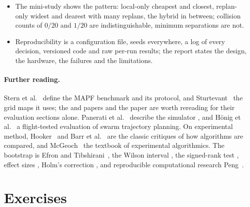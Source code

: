 \begin{summary}
\begin{itemize}
        (\cref{thm:ch25-three}), means with $t$ intervals, skewed metrics
        with medians and IQR, paired differences with intervals and $d_z$,
        success rates with the cap; draw box plots per level, cactus plots
        for effort, Pareto plots for the safety--efficiency trade-off.
  \item The mini-study shows the pattern: local-only cheapest and closest,
        replan-only widest and dearest with many replans, the hybrid in
        between; collision counts of $0/20$ and $1/20$ are
        indistinguishable, minimum separations are not.
  \item Reproducibility is a configuration file, seeds everywhere, a log of
        every decision, versioned code and raw per-run results; the report
        states the design, the hardware, the failures and the limitations.
\end{itemize}
\end{summary}

\paragraph{Further reading.}
Stern et al.~\cite{stern2019mapf} define the MAPF benchmark and its
protocol, and Sturtevant~\cite{sturtevant2012benchmarks} the grid maps it
uses; the \cbs and \ecbs papers \cite{sharon2015cbs,barer2014ecbs} and the
\orca paper \cite{vandenberg2011orca} are worth rereading for their
evaluation sections alone. Panerati et al.~\cite{panerati2021learning}
describe the simulator \allowbreak{}, and H{\"o}nig et
al.~\cite{honig2018trajectory} a flight-tested evaluation of swarm
trajectory planning. On experimental method, Hooker~\cite{hooker1995testing}
and Barr et al.~\cite{barr1995designing} are the classic critiques of how
algorithms are compared, and McGeoch~\cite{mcgeoch2012guide} the textbook
of experimental algorithmics. The bootstrap is Efron and
Tibshirani~\cite{efron1993bootstrap}, the Wilson interval
\cite{wilson1927probable}, the signed-rank test
\cite{wilcoxon1945individual}, effect sizes \cite{cohen1988power},
Holm's correction \cite{holm1979simple}, and reproducible computational
research Peng~\cite{peng2011reproducible}.

\section{Exercises}
\label{sec:ch25-exercises}

